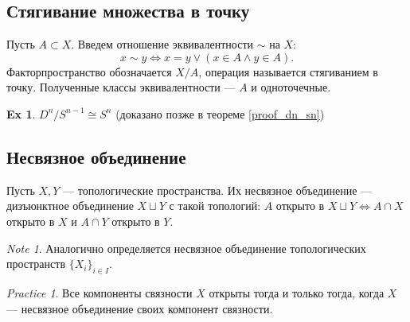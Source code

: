 \documentclass[11pt]{book}
\theoremstyle{definition}
\theoremstyle{plain}
\theoremstyle{plain}
\theoremstyle{definition}
\newtheorem*{ex}{Ex}
\theoremstyle{remark}
\newtheorem*{note}{Note}
\newtheorem*{prac}{Practice}
\begin{document}
\subsection{Стягивание множества в точку}
\begin{defn}
    Пусть $ A\subset X$. Введем отношение эквивалентности $ \sim $ на $ X$:
    \[
	x \sim  y \Longleftrightarrow x = y \vee (x \in  A \wedge y \in  A)
    .\]
    Факторпространство обозначается $ X / A$, операция называется стягиванием в точку. Полученные классы эквивалентности ---  $ A$ и одноточечные.
\end{defn}
\begin{ex}
    $ D^{n}/ S^{n-1} \cong S^{n} $ (доказано позже в теореме \ref{proof_dn_sn})
\end{ex}
\subsection{Несвязное объединение}
\begin{defn}
    Пусть $ X, Y$ --- топологические пространства. Их несвязное объединение --- дизъюнктное объединение $ X \sqcup Y$ с такой топологий:  $ A $ открыто в  $ X \sqcup Y \Longleftrightarrow A \cap X$ открыто в $ X$ и  $ A \cap Y$ открыто в $ Y$.
\end{defn}
\begin{note}
    Аналогично определяется несвязное объединение топологических пространств  $ \{X_i\}_{i \in  I}$.
\end{note}
\begin{prac}
    Все компоненты связности $ X$ открыты  тогда и только тогда, когда $ X$ --- несвязное объединение своих компонент связности.
\end{prac}
\end{document}
